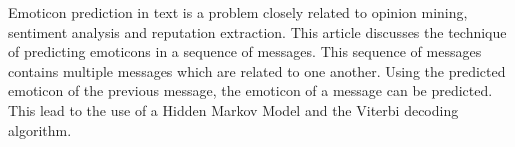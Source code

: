 Emoticon prediction in text is a problem closely related to opinion mining, sentiment analysis and reputation extraction. This article discusses the technique of predicting emoticons in a sequence of messages. This sequence of messages contains multiple messages which are related to one another. Using the predicted emoticon of the previous message, the emoticon of a message can be predicted. This lead to the use of a Hidden Markov Model and the Viterbi decoding algorithm.

\begin{comment}
\red{Refine the abstract, maybe add most important results, a bit too much `lead`} \\
Emoticon prediction in text is a problem closely related to opinion mining, sentiment analysis and reputation extraction. This article discusses two different techniques for predicting emoticons. In the first case, emoticons are predicted based on a single, short message. This lead to the use of an average multiclass perceptron. In the second case, emoticons are predicted, using messages posted in the past. This leads to the previous message also determining the emotion of the message analyzed. This lead to the use of a Hidden Markov Model and the Viterbi decoding algorithm.
\end{comment}